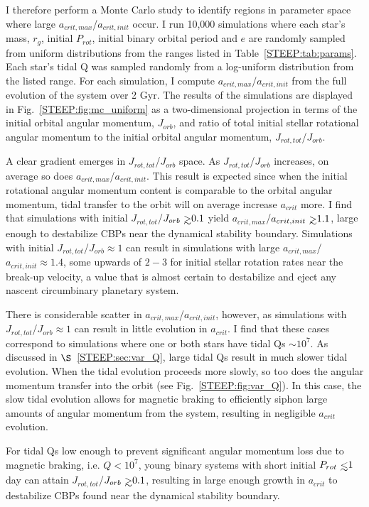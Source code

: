 I therefore perform a Monte Carlo study to identify regions in parameter space where large $a_{crit,max}$/$a_{crit,init}$ occur.  I run 10,000 simulations where each star's mass, $r_g$, initial $P_{rot}$, initial binary orbital period and $e$ are randomly sampled from uniform distributions from the ranges listed in Table~\ref{STEEP:tab:params}.  Each star's tidal Q was sampled randomly from a log-uniform distribution from the listed range.  For each simulation, I compute $a_{crit,max}$/$a_{crit,init}$ from the full evolution of the system over 2 Gyr.  The results of the simulations are displayed in Fig.~\ref{STEEP:fig:mc_uniform} as a two-dimensional projection in terms of the initial orbital angular momentum, $J_{orb}$, and ratio of total initial stellar rotational angular momentum to the initial orbital angular momentum, $J_{rot,tot}$/$J_{orb}$.

A clear gradient emerges in $J_{rot,tot}$/$J_{orb}$ space.  As $J_{rot,tot}$/$J_{orb}$ increases, on average so does $a_{crit,max}$/$a_{crit,init}$.  This result is expected since when the initial rotational angular momentum content is comparable to the orbital angular momentum, tidal transfer to the orbit will on average increase $a_{crit}$ more.  I find that simulations with initial $J_{rot,tot}$/$J_{orb} \gsim 0.1$ yield $a_{crit,max}$/$a_{crit,init} \gsim 1.1$, large enough to destabilize CBPs near the dynamical stability boundary.  Simulations with initial $J_{rot,tot}$/$J_{orb} \approx 1$ can result in simulations with large $a_{crit,max}$/$a_{crit,init} \approx 1.4$, some upwards of $2-3$ for initial stellar rotation rates near the break-up velocity, a value that is almost certain to destabilize and eject any nascent circumbinary planetary system.

There is considerable scatter in $a_{crit,max}$/$a_{crit,init}$, however, as simulations with $J_{rot,tot}$/$J_{orb} \approx 1$ can result in little evolution in $a_{crit}$.  I find that these cases correspond to simulations where one or both stars have tidal Qs ${\sim}10^7$.  As discussed in $\S$~\ref{STEEP:sec:var_Q}, large tidal Qs result in much slower tidal evolution.  When the tidal evolution proceeds more slowly, so too does the angular momentum transfer into the orbit (see Fig.~\ref{STEEP:fig:var_Q}).  In this case, the slow tidal evolution allows for magnetic braking to efficiently siphon large amounts of angular momentum from the system, resulting in negligible $a_{crit}$ evolution.

For tidal Qs low enough to prevent significant angular momentum loss due to magnetic braking, i.e. $Q < 10^7$, young binary systems with short initial $P_{rot} \lsim 1$ day can attain $J_{rot,tot}$/$J_{orb} \gsim 0.1$, resulting in large enough growth in $a_{crit}$ to destabilize CBPs found near the dynamical stability boundary.  

